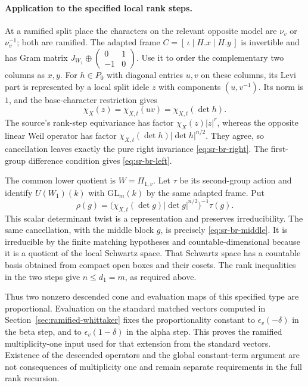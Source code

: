 \paragraph{Application to the specified local rank steps.}
At a ramified split place the characters on the relevant
opposite model are \(\nu_v\) or \(\nu_v^{-1}\); both are
ramified.  The adapted frame
\(C=[\,\iota\mid H.x\mid H.y\,]\) is invertible and has Gram
matrix \(J_{W_1}\oplus
\left(\begin{smallmatrix}0&1\\-1&0\end{smallmatrix}\right)\).
Use it to order the complementary two columns as \(x,y\).
For \(h\in P_0\) with diagonal entries \(u,v\) on these
columns, its Levi part is represented by a local split
idele \(z\) with components \((u,v^{-1})\).
Its norm is \(1\), and the base-character restriction gives
\[
                \chi_X(z)=\chi_{X,t}(uv)
                          =\chi_{X,t}(\det h).
\]
The source's rank-step equivariance has factor
\(\chi_X(z)|z|^r\), whereas the opposite linear Weil
operator has factor
\(\chi_{X,t}(\det h)|\det h|^{n/2}\).
They agree, so cancellation leaves exactly the pure
right invariance \eqref{eq:sr-br-right}.
The first-group difference condition gives
\eqref{eq:sr-br-left}.

The common lower quotient is \(W=\Pi_{1,v}\).
Let \(\tau\) be its second-group action and identify
\(U(W_1)(k)\) with \(\mathrm{GL}_m(k)\) by the same adapted
frame.  Put
\[
 \rho(g)=
   \bigl(\chi_{X,t}(\det g)|\det g|^{n/2}\bigr)^{-1}
                      \tau(g).
\]
This scalar determinant twist is a representation and
preserves irreducibility.  The same cancellation, with the
middle block \(g\), is precisely
\eqref{eq:sr-br-middle}.  It is irreducible by the finite
matching hypotheses and countable-dimensional because it is
a quotient of the local Schwartz space.  That Schwartz space
has a countable basis obtained from compact open boxes and
their cosets.  The rank inequalities in the two steps give
\(n\le d_1=m\), as required above.

Thus two nonzero descended cone and evaluation maps of this
specified type are proportional.  Evaluation on the standard
matched vectors computed in
Section~\ref{sec:ramified-whittaker} fixes the proportionality
constant to \(\epsilon_v(-\delta)\) in the beta step, and to
\(\epsilon_v(1-\delta)\) in the alpha step.
This proves the ramified multiplicity-one input used for that
extension from the standard vectors.  Existence of the
descended operators and the global constant-term argument
are not consequences of multiplicity one and remain separate
requirements in the full rank recursion.


